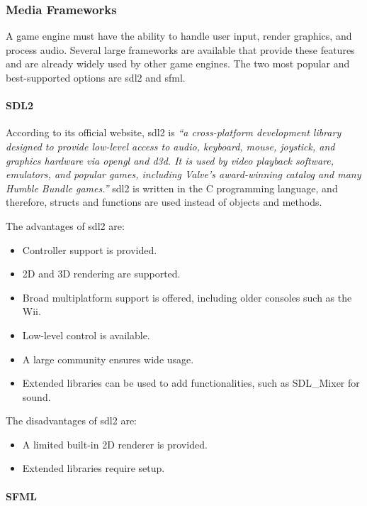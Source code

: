 \documentclass{projdoc}
\begin{document}
\subsubsection{Media Frameworks}

A game engine must have the ability to handle user input, render graphics, and
process audio. Several large frameworks are available that provide these features and
are already widely used by other game engines. The two most popular and
best-supported options are \gls{sdl2} and \gls{sfml}.

\paragraph{SDL2}

According to its official website, \gls{sdl2} is \emph{``a cross-platform development
library designed to provide low-level access to audio, keyboard, mouse, joystick, and
graphics hardware via \gls{opengl} and \gls{d3d}. It is used by video playback
software, emulators, and popular games, including Valve's award-winning catalog and
many Humble Bundle games.''} \gls{sdl2} is written in the C programming language, and
therefore, structs and functions are used instead of objects and methods.

The advantages of \gls{sdl2} are:\noparbreak
\begin{itemize}
	\item Controller support is provided.
	\item 2D and 3D rendering are supported.
	\item Broad multiplatform support is offered, including older consoles such as the
		Wii.
	\item Low-level control is available.
	\item A large community ensures wide usage.
	\item Extended libraries can be used to add functionalities, such as SDL\_Mixer for
		sound.
\end{itemize}

The disadvantages of \gls{sdl2} are:\noparbreak
\begin{itemize}
	\item A limited built-in 2D renderer is provided.
	\item Extended libraries require setup.
\end{itemize}

\paragraph{SFML}
\end{document}

